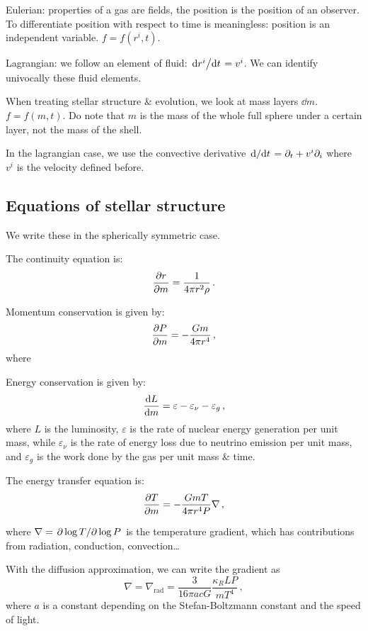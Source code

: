 \documentclass[main.tex]{subfiles}
\begin{document}
Eulerian: properties of a gas are fields, the position is the position of an observer.
To differentiate position with respect to time is meaningless: position is an independent variable. \(f = f(r^i, t)\).

Lagrangian: we follow an element of fluid: \(\dv*{r^i}{t} = v^i \). We can identify univocally these fluid elements.

When treating stellar structure \& evolution, we look at mass layers \(\dd{m}\).  \(f = f(m, t)\). Do note that \(m\) is the mass of the whole full sphere under a certain layer, not the mass of the shell.

In the lagrangian case, we use the convective derivative \(\dv*{}{t} = \partial_t + v^i \partial_i\) where \(v^i\) is the velocity defined before.

\subsection{Equations of stellar structure}

We write these in the spherically symmetric case.

The continuity equation is:
%
\begin{equation}
    \pdv{r}{m} = \frac{1}{4 \pi r^2 \rho} \,.
\end{equation}

Momentum conservation is given by:
%
\begin{equation}
    \pdv{P}{m} = - \frac{Gm}{4 \pi r^4}\,,
\end{equation}
%
where

Energy conservation is given by:
%
\begin{equation}
    \dv{L}{m} = \varepsilon - \varepsilon_\nu - \varepsilon_g \,,
\end{equation}
%
where \(L\) is the luminosity, \(\varepsilon\) is the rate of nuclear energy generation per unit mass, while \(\varepsilon_\nu\) is the rate of energy loss due to neutrino emission per unit mass, and \(\varepsilon_g \) is the work done by the gas per unit mass \& time.

The energy transfer equation is:
%
\begin{equation}
    \pdv{T}{m} = - \frac{GmT}{4 \pi r^4 P} \nabla \,,
\end{equation}

where \(\nabla = \pdv*{\log T}{\log P} \) is the temperature gradient, which has contributions from radiation, conduction, convection\dots

With the diffusion approximation, we can write the gradient as
%
\begin{equation} \label{eq:diffusion-approx-gradient}
    \nabla = \nabla_{\text{rad}} = \frac{3}{16 \pi a c G} \frac{\kappa_R L P}{mT^4} \,,
\end{equation}
%
where \(a\) is a constant depending on the Stefan-Boltzmann constant and the speed of light.
\end{document}
